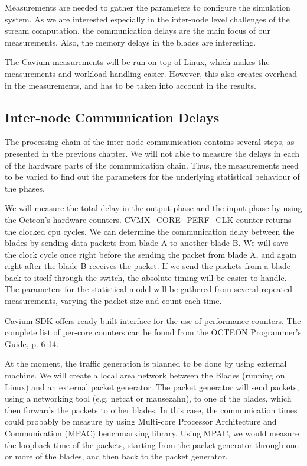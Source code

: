 Measurements are needed to gather the parameters to configure the simulation system. As we are interested especially in the inter-node level challenges of the stream computation, the communication delays are the main focus of our measurements. Also, the memory delays in the blades are interesting.

The Cavium measurements will be run on top of Linux, which makes the measurements and workload handling easier. However, this also creates overhead in the measurements, and has to be taken into account in the results.

\subsection{Inter-node Communication Delays}
The processing chain of the inter-node communication contains several steps, as presented in the previous chapter. We will not able to measure the delays in each of the hardware parts of the communication chain. Thus, the measurements need to be varied to find out the parameters for the underlying statistical behaviour of the phases.

We will measure the total delay in the output phase and the input phase by using the Octeon's hardware counters. CVMX\_CORE\_PERF\_CLK counter returns the clocked cpu cycles. We can determine the communication delay between the blades by sending data packets from blade A to another blade B. We will save the clock cycle once right before the sending the packet from blade A, and again right after the blade B receives the packet. If we send the packets from a blade back to itself through the switch, the absolute timing will be easier to handle. The parameters for the statistical model will be gathered from several repeated measurements, varying the packet size and count each time.

Cavium SDK offers ready-built interface for the use of performance counters. The complete list of per-core counters can be found from the OCTEON Programmer's Guide, p. 6-14.

At the moment, the traffic generation is planned to be done by using external machine. We will create a local area network between the Blades (running on Linux) and an external packet generator. The packet generator will send packets, using a networking tool (e.g. netcat or mausezahn), to one of the blades, which then forwards the packets to other blades. In this case, the communication times could probably be measure by using Multi-core Processor Architecture and Communication (MPAC) benchmarking library. Using MPAC, we would measure the loopback time of the packets, starting from the packet generator through one or more of the blades, and then back to the packet generator.

